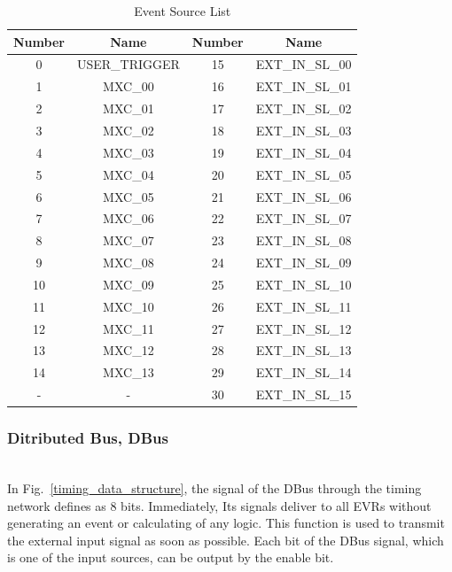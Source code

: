 \documentclass[journal,reqno]{IEEEtran}
\begin{document}
\begin{table}[h!t]
	\centering
	\caption{Event Source List}
	\label{event_tri_list}
	
	\begin{tabular}{@{}c|c|c|c@{}}
		\hline
		\textbf{Number}	& \textbf{Name}			& \textbf{Number}		& \textbf{Name}\\
		\hline
		0				& USER\_TRIGGER			& 15					& EXT\_IN\_SL\_00\\
		1				& MXC\_00				& 16					& EXT\_IN\_SL\_01\\
		2				& MXC\_01				& 17					& EXT\_IN\_SL\_02\\
		3				& MXC\_02				& 18					& EXT\_IN\_SL\_03\\
		4				& MXC\_03				& 19					& EXT\_IN\_SL\_04\\
		5				& MXC\_04				& 20					& EXT\_IN\_SL\_05\\
		6				& MXC\_05				& 21					& EXT\_IN\_SL\_06\\
		7				& MXC\_06				& 22					& EXT\_IN\_SL\_07\\
		8				& MXC\_07				& 23					& EXT\_IN\_SL\_08\\
		9				& MXC\_08				& 24					& EXT\_IN\_SL\_09\\
		10				& MXC\_09				& 25					& EXT\_IN\_SL\_10\\
		11				& MXC\_10				& 26					& EXT\_IN\_SL\_11\\
		12				& MXC\_11				& 27					& EXT\_IN\_SL\_12\\
		13				& MXC\_12				& 28					& EXT\_IN\_SL\_13\\
		14				& MXC\_13				& 29					& EXT\_IN\_SL\_14\\
		-				& -						& 30					& EXT\_IN\_SL\_15\\
		\hline
	\end{tabular}
\end{table}

\subsubsection{Ditributed Bus, DBus}\hspace*{\fill} \\
In Fig.~\ref{timing_data_structure}, the signal of the DBus through the timing network defines as 8 bits. Immediately, Its signals deliver to all EVRs without generating an event or calculating of any logic. This function is used to transmit the external input signal as soon as possible. Each bit of the DBus signal, which is one of the input sources, can be output by the enable bit.\newline
\end{document}
